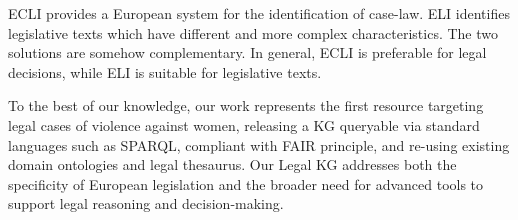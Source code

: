 \documentclass[runningheads]{llncs}
\begin{document}
ECLI provides a European system for the identification of case-law. ELI identifies legislative texts which have different and more complex characteristics. The two solutions are somehow complementary. In general, ECLI is preferable for legal decisions, while ELI is suitable for legislative texts.

To the best of our knowledge, our work represents the first resource targeting legal cases of violence against women, releasing a KG queryable via standard languages such as SPARQL, compliant with FAIR principle, and re-using existing domain ontologies and legal thesaurus. Our Legal KG addresses both the specificity of European legislation and the broader need for advanced tools to support legal reasoning and decision-making.

\end{document}
